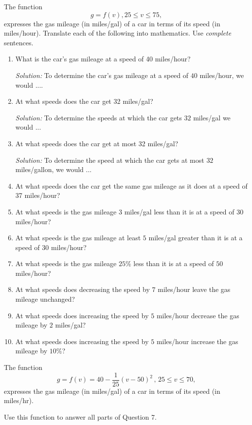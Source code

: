 \documentclass{ximera}
\begin{document}
\begin{question} \label{Qef3er}
The function
\[
   g = f(v) , 25 \leq v \leq 75 ,
\]
expresses the gas mileage (in miles/gal) of a car in terms of its speed (in miles/hour). Translate each of the following into mathematics. Use \emph{complete} sentences.

\begin{enumerate}

\item What is the car's gas mileage at a speed of 40 miles/hour?


\emph{Solution:} To determine the car's gas mileage at a speed of $40$ miles/hour, we would ....

\item At what speeds does the car get 32 miles/gal?


\emph{Solution:} To determine the speeds at which the car gets $32$ miles/gal we would ...


\item At what speeds does the car get at most 32 miles/gal?


\emph{Solution:} To determine the speed at which the car gets at most $32$ miles/gallon, we would ...

\item At what speeds does the car get the same gas mileage as it does at a speed of 37 miles/hour?

\item At what speeds is the gas mileage $3$ miles/gal less than it is at a speed of 30 miles/hour?

\item At what speeds is the gas mileage at least $5$ miles/gal greater than it is at a speed of $30$ miles/hour?

\item At what speeds is the gas mileage $25\%$ less than it is at a speed of $50$ miles/hour?

\item At what speeds does decreasing the speed by $7$ miles/hour leave the gas mileage unchanged?

\item At what speeds does increasing the speed by $5$ miles/hour decrease the gas mileage by $2$ miles/gal?

\item At what speeds does increasing the speed by $5$ miles/hour increase the gas mileage by $10\%$?

\end{enumerate}
\end{question}

\begin{question} \label{Q9efr3r}
The function
\[
    g = f(v) = 40-\frac{1}{25}\left(v-50\right)^{2} \, , \, 25\leq v \leq 70 ,
\]
expresses the gas mileage (in miles/gal) of a car in terms of its speed (in miles/hr).

Use this function to answer all parts of Question 7.
\end{question}
\end{document}
